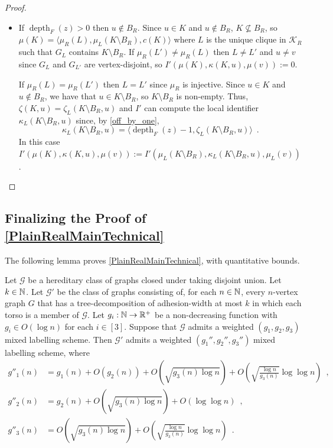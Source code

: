 \documentclass{patmorin}
\let\eqref\cref
\newcommand{\david}[1]{\noindent{\color{orange} DW: #1}}
\newcommand{\vida}[1]{\noindent{\color{pink} VD: #1}}
\DeclareMathOperator{\depth}{depth}
\newcommand{\Oh}{O}
\newcommand{\calG}{\mathcal{G}}
\newcommand{\calK}{\mathcal{K}}
\begin{document}
\begin{proof}
\begin{itemize}
\begin{itemize}
      \item If $\depth_F(z)>0$ then $u\not\in B_R$.  Since $u\in K$ and $u\not\in B_R$, $K\not\subseteq B_R$, so $\mu(K)=\langle \mu_R(L),\mu_{L}(K\setminus B_R),c(K)\rangle$ where $L$ is the unique clique in $\calK_R$ such that $G_L$ contains $K\setminus B_R$.  If $\mu_R(L')\neq \mu_R(L)$ then $L\neq L'$ and $u\neq v$ since $G_{L}$ and $G_{L'}$ are vertex-disjoint, so $I'(\mu(K),\kappa(K,u),\mu(v)):=0$.

      If $\mu_R(L)=\mu_R(L')$ then $L=L'$ since $\mu_R$ is injective.
      Since $u\in K$ and $u\not\in B_R$, we have that $u\in K\setminus B_R$, so $K\setminus B_R$ is non-empty. Thus, $\zeta(K,u)=\zeta_L(K\setminus B_R,u)$
      and $I'$ can compute the local identifier $\kappa_L(K\setminus B_R,u)$ since, by \eqref{off_by_one},
      \[
        \kappa_L(K\setminus B_R,u) = \langle \depth_F(z)-1, \zeta_L(K\setminus B_R,u)\rangle\enspace.
      \]
      In this case $I'(\mu(K),\kappa(K,u),\mu(v)):=I'(\mu_L(K\setminus B_R),\kappa_L(K\setminus B_R,u),\mu_L(v))$. \qedhere
    \end{itemize}
  \end{itemize}
\end{proof}

\subsection{Finalizing the Proof of \texorpdfstring{\cref{PlainRealMainTechnical}}{Theorem \ref*{PlainRealMainTechnical}}}
\label{sec:finalizing}

The following lemma proves \cref{PlainRealMainTechnical}, with quantitative bounds.

\begin{lem}\label{RealMainTechnical}
  Let $\calG$ be a hereditary class of graphs closed under taking disjoint union.
  Let $k\in\mathbb{N}$.
  Let $\calG'$ be the class of graphs consisting of, for each $n\in\mathbb{N}$,  every $n$-vertex graph $G$ that has a tree-decomposition of adhesion-width at most $k$ in which each torso is a member of $\calG$.
  Let $g_i:\mathbb{N}\to\mathbb{R}^+$ be a non-decreasing function with $g_i\in\Oh(\log n)$ for each $i\in[3]$.
  Suppose that $\calG$ admits a weighted $(g_1,g_2,g_3)$ mixed labelling scheme.
  Then $\calG'$ admits a weighted $(g_1'',g_2'',g_3'')$ mixed labelling scheme, where
  \begin{align*}
    g''_1(n)
     & = g_1(n) + \Oh(g_2(n)) + \Oh\left(\sqrt{g_3(n)\log n}\right) + \Oh\left(\sqrt{\frac{\log n}{g_3(n)}}\log\log n\right) \enspace , \\
    g''_2(n)
     & = g_2(n) + \Oh\left(\sqrt{g_3(n)\log n}\right) + \Oh(\log\log n)  \enspace ,                                                     \\
    g''_3(n)
     & = \Oh\left(\sqrt{g_3(n)\log n}\right) + \Oh\left(\sqrt{\frac{\log n}{g_3(n)}}\log\log n\right) \enspace .
  \end{align*}
\end{lem}
\end{document}
